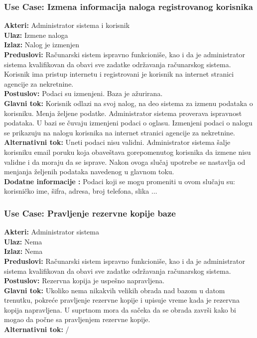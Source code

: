 \documentclass{article}
\begin{document}
\subsubsection{\bfseries Use Case: Izmena informacija naloga registrovanog korisnika}
{\bfseries Akteri:} Administrator sistema i korisnik\\
{\bfseries Ulaz:} Izmene naloga\\
{\bfseries Izlaz:} Nalog je izmenjen\\
{\bfseries Preduslovi:} Ra\v {c}unarski sistem ispravno funkcioni\v {s}e, kao i da je administrator sistema kvalifikovan da obavi sve zadatke odr\v {z}avanja ra\v {c}unarskog sistema. Korisnik ima pristup internetu i registrovani je korisnik na internet stranici agencije za nekretnine.\\
{\bfseries Postuslov:} Podaci su izmenjeni. Baza je a\v {z}urirana.\\
{\bfseries Glavni tok:} Korisnik odlazi na svoj nalog, na deo sistema za izmenu podataka o korisniku. Menja \v {z}eljene podatke. Administrator sistema proverava ispravnost podataka. U bazi se \v {c}uvaju izmenjeni podaci o oglasu. Izmenjeni podaci o nalogu se prikazuju na nalogu korisnika na internet stranici agencije za nekretnine.\\
{\bfseries Alternativni tok:} Uneti podaci nisu validni. Administrator sistema \v {s}alje korisniku email poruku koja obave\v {s}tava gorepomenutog korisnika da izmene nisu validne i da moraju da se isprave. Nakon ovoga slu\v {c}aj upotrebe se nastavlja od menjanja \v {z}eljenih podataka navedenog u glavnom toku.\\
{\bfseries Dodatne informacije :} Podaci koji se mogu promeniti u ovom slu\v {c}aju su: korisni\v {c}ko ime, \v {s}ifra, adresa, broj telefona, slika ...\\
\subsubsection{\bfseries Use Case: Pravljenje rezervne kopije baze}
{\bfseries Akteri:} Administrator sistema\\
{\bfseries Ulaz:} Nema\\
{\bfseries Izlaz:} Nema\\
{\bfseries Preduslovi:} Ra\v {c}unarski sistem ispravno funkcioni\v {s}e, kao i da je administrator sistema kvalifikovan da obavi sve zadatke odr\v {z}avanja ra\v {c}unarskog sistema.\\
{\bfseries Postuslov:} Rezervna kopija je uspe\v {s}no napravljena.\\
{\bfseries Glavni tok:} Ukoliko nema nikakvih velikih obrada nad bazom u datom trenutku, pokre\' ce pravljenje rezervne kopije i upisuje vreme kada je rezervna kopija napravljena. U suprtnom mora da sa\v {c}eka da se obrada zavr\v {s}i kako bi mogao da po\v {c}ne sa pravljenjem rezervne kopije.\\
{\bfseries Alternativni tok:} /\\
\end{document}
